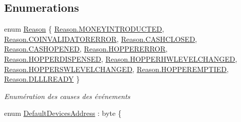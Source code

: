 \subsection*{Enumerations}
\begin{DoxyCompactItemize}
\item 
enum \mbox{\hyperlink{namespace_device_library_aecf5c8419c6482aed0b21decb1663754}{Reason}} \{ \newline
\mbox{\hyperlink{namespace_device_library_aecf5c8419c6482aed0b21decb1663754a2d8903297c687d6ee3f010d98c1624a3}{Reason.\+M\+O\+N\+E\+Y\+I\+N\+T\+R\+O\+D\+U\+C\+T\+ED}}, 
\mbox{\hyperlink{namespace_device_library_aecf5c8419c6482aed0b21decb1663754a227f7186426f2e265a08a62825b92623}{Reason.\+C\+O\+I\+N\+V\+A\+L\+I\+D\+A\+T\+O\+R\+E\+R\+R\+OR}}, 
\mbox{\hyperlink{namespace_device_library_aecf5c8419c6482aed0b21decb1663754a1e6108a5eb452674d7f51aedbd45a29f}{Reason.\+C\+A\+S\+H\+C\+L\+O\+S\+ED}}, 
\mbox{\hyperlink{namespace_device_library_aecf5c8419c6482aed0b21decb1663754adfa418a7f626fcbd28a514d80ca04317}{Reason.\+C\+A\+S\+H\+O\+P\+E\+N\+ED}}, 
\newline
\mbox{\hyperlink{namespace_device_library_aecf5c8419c6482aed0b21decb1663754a01e41b57f4a2a1f8a8fcae7f10bdfcdf}{Reason.\+H\+O\+P\+P\+E\+R\+E\+R\+R\+OR}}, 
\mbox{\hyperlink{namespace_device_library_aecf5c8419c6482aed0b21decb1663754a3f3d91fc4089282534619aac3104f86e}{Reason.\+H\+O\+P\+P\+E\+R\+D\+I\+S\+P\+E\+N\+S\+ED}}, 
\mbox{\hyperlink{namespace_device_library_aecf5c8419c6482aed0b21decb1663754ab4c0de530a8fd3dcb909097545348413}{Reason.\+H\+O\+P\+P\+E\+R\+H\+W\+L\+E\+V\+E\+L\+C\+H\+A\+N\+G\+ED}}, 
\mbox{\hyperlink{namespace_device_library_aecf5c8419c6482aed0b21decb1663754aa1cad118fd6cf8b1861931f36e4a6671}{Reason.\+H\+O\+P\+P\+E\+R\+S\+W\+L\+E\+V\+E\+L\+C\+H\+A\+N\+G\+ED}}, 
\newline
\mbox{\hyperlink{namespace_device_library_aecf5c8419c6482aed0b21decb1663754a31ce8fea7e7cedf03c7e099848c4af0e}{Reason.\+H\+O\+P\+P\+E\+R\+E\+M\+P\+T\+I\+ED}}, 
\mbox{\hyperlink{namespace_device_library_aecf5c8419c6482aed0b21decb1663754a02329a248129261e531c515aabab49eb}{Reason.\+D\+L\+L\+L\+R\+E\+A\+DY}}
 \}
\begin{DoxyCompactList}\small\item\em Enumération des causes des événements \end{DoxyCompactList}\item 
enum \mbox{\hyperlink{namespace_device_library_a4ca177654b0e196e5a5f5275fb4ea5ee}{Default\+Devices\+Address}} \+: byte \{ \newline

\end{DoxyCompactItemize}
